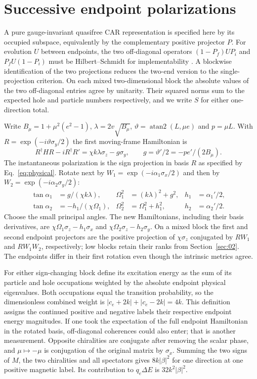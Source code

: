 \section{Successive endpoint polarizations}\label{sec:03}
A pure gauge-invariant quasifree CAR representation is specified here by its occupied subspace, equivalently by the complementary positive projector $P$. For evolution $U$ between endpoints, the two off-diagonal operators $(1-P_f)UP_i$ and $P_f U(1-P_i)$ must be Hilbert--Schmidt for implementability \cite[Prop.~5]{avron}. A blockwise identification of the two projections reduces the two-end version to the single-projection criterion. On each mixed two-dimensional block the absolute values of the two off-diagonal entries agree by unitarity. Their squared norms sum to the expected hole and particle numbers respectively, and we write $S$ for either one-direction total.

Write $B_\mu=1+\mu^2(e^2-1)$, $\lambda=2v\sqrt{B_\mu}$,
$\vartheta=\operatorname{atan2}(L,\mu e)$ and $p=\mu L$. With
$R=\exp(-i\vartheta\sigma_y/2)$ the first moving-frame Hamiltonian is
\[
 R^\dagger H R-iR^\dagger R'=\chi k\lambda\sigma_z-g\sigma_y,\qquad
 g=\vartheta'/2=-p e'/(2 B_\mu).
\]
The instantaneous polarization is the sign projection in basis $R$ as specified by Eq.~\eqref{eq:physical}. Rotate next by $W_1=\exp(-i\alpha_1\sigma_x/2)$ and then by $W_2=\exp(-i\alpha_2\sigma_y/2)$:
\begin{align}
 \tan\alpha_1&=g/(\chi k\lambda), &
 \Omega_1^2&=(k\lambda)^2+g^2,& h_1&=\alpha_1'/2,\nonumber\\
 \tan\alpha_2&=-h_1/(\chi\Omega_1),&
 \Omega_2^2&=\Omega_1^2+h_1^2,& h_2&=\alpha_2'/2 .           \label{eq:rot}
\end{align}
Choose the small principal angles. The new Hamiltonians, including their basis derivatives, are $\chi\Omega_1\sigma_z-h_1\sigma_x$ and $\chi\Omega_2\sigma_z-h_2\sigma_y$. On a mixed block the first and second endpoint projectors are the positive projection of $\chi\sigma_z$ conjugated by $RW_1$ and $RW_1W_2$, respectively; low blocks retain their ranks from Section~\ref{sec:02}. The endpoints differ in their first rotation even though the intrinsic metrics agree.

For either sign-changing block define its excitation energy as the sum of its particle and hole occupations weighted by the absolute endpoint physical eigenvalues. Both occupations equal the transition probability, so the dimensionless combined weight is $|c_e+2k|+|c_e-2k|=4k$. This definition assigns the continued positive and negative labels their respective endpoint energy magnitudes. If one took the expectation of the full endpoint Hamiltonian in the rotated basis, off-diagonal coherences could also enter; that is another measurement. Opposite chiralities are conjugate after removing the scalar phase, and $\mu\mapsto-\mu$ is conjugation of the original matrix by $\sigma_x$. Summing the two signs of $M$, the two chiralities and all spectators gives $8k|\beta|^2$ for one direction at one positive magnetic label. Its contribution to $q_e\Delta E$ is $32k^2|\beta|^2$.

